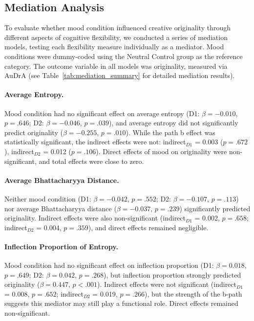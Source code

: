 \documentclass[../MA_Thesis.tex]{subfiles}
\begin{document}
\begin{appendix}
\newpage
\section{Mediation Analysis}
\label{appendix: mediation_analysis_results}
To evaluate whether mood condition influenced creative originality through different aspects of cognitive flexibility, we conducted a series of mediation models, testing each flexibility measure individually as a mediator. Mood conditions were dummy-coded using the Neutral Control group as the reference category. The outcome variable in all models was originality, measured via AuDrA (see Table~\ref{tab:mediation_summary} for detailed mediation results).

\paragraph{Average Entropy.}
Mood condition had no significant effect on average entropy (D1: $\beta = -0.010$, $p = .646$; D2: $\beta = -0.046$, $p = .039$), and average entropy did not significantly predict originality ($\beta = -0.255$, $p = .010$). While the path b effect was statistically significant, the indirect effects were not: indirect$_{D1}$ = 0.003 ($p = .672$), indirect$_{D2}$ = 0.012 ($p = .106$). Direct effects of mood on originality were non-significant, and total effects were close to zero.

\paragraph{Average Bhattacharyya Distance.}
Neither mood condition (D1: $\beta = -0.042$, $p = .552$; D2: $\beta = -0.107$, $p = .113$) nor average Bhattacharyya distance ($\beta = -0.037$, $p = .239$) significantly predicted originality. Indirect effects were also non-significant (indirect$_{D1}$ = 0.002, $p = .658$; indirect$_{D2}$ = 0.004, $p = .359$), and direct effects remained negligible.

\paragraph{Inflection Proportion of Entropy.}
Mood condition had no significant effect on inflection proportion (D1: $\beta = 0.018$, $p = .649$; D2: $\beta = 0.042$, $p = .268$), but inflection proportion strongly predicted originality ($\beta = 0.447$, $p < .001$). Indirect effects were not significant (indirect$_{D1}$ = 0.008, $p = .652$; indirect$_{D2}$ = 0.019, $p = .266$), but the strength of the b-path suggests this mediator may still play a functional role. Direct effects remained non-significant.


\end{appendix}
\end{document}
